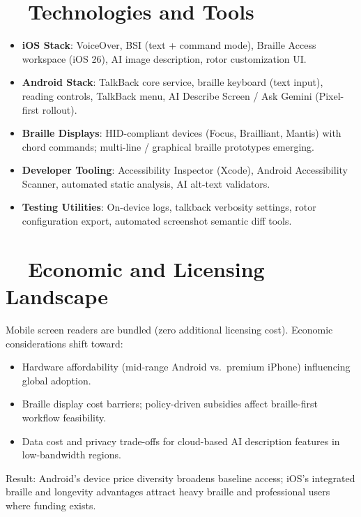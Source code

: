 \section{~~Technologies and Tools}
\label{sec:sr26-technologies}
\begin{itemize}
	\item \textbf{iOS Stack}: VoiceOver, BSI (text + command mode), Braille Access workspace (iOS 26), AI image description, rotor customization UI.
	\item \textbf{Android Stack}: TalkBack core service, braille keyboard (text input), reading controls, TalkBack menu, AI Describe Screen / Ask Gemini (Pixel-first rollout).
	\item \textbf{Braille Displays}: HID-compliant devices (Focus, Brailliant, Mantis) with chord commands; multi-line / graphical braille prototypes emerging.
	\item \textbf{Developer Tooling}: Accessibility Inspector (Xcode), Android Accessibility Scanner, automated static analysis, AI alt-text validators.
	\item \textbf{Testing Utilities}: On-device logs, talkback verbosity settings, rotor configuration export, automated screenshot semantic diff tools.
\end{itemize}

\section{~~Economic and Licensing Landscape}
\label{sec:sr26-economics}
Mobile screen readers are bundled (zero additional licensing cost). Economic considerations shift toward:
\begin{itemize}
	\item Hardware affordability (mid-range Android vs.\ premium iPhone) influencing global adoption.
	\item Braille display cost barriers; policy-driven subsidies affect braille-first workflow feasibility.
	\item Data cost and privacy trade-offs for cloud-based AI description features in low-bandwidth regions.
\end{itemize}
Result: Android’s device price diversity broadens baseline access; iOS’s integrated braille and longevity advantages attract heavy braille and professional users where  funding exists.

